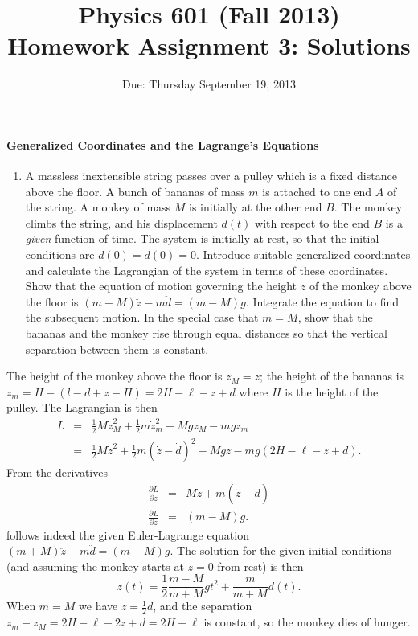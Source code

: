 \documentclass[letterpaper,11pt]{article}
\title{Physics 601 (Fall 2013) \\ Homework Assignment 3: Solutions}
\date{Due: Thursday September 19, 2013}
\begin{document}
\maketitle

\paragraph*{Generalized Coordinates and the Lagrange's Equations}
\begin{enumerate}
 \item A massless inextensible string passes over a pulley which is a fixed distance above the floor.  A bunch of bananas of mass $m$ is attached to one end $A$ of the string.  A monkey of mass $M$ is initially at the other end $B$. The monkey climbs the string, and his displacement $d(t)$ with respect to the end $B$ is a \emph{given} function of time.  The system is initially at rest, so that the initial conditions are $d(0) = \dot{d}(0) = 0$.  Introduce suitable generalized coordinates and calculate the Lagrangian of the system in terms of these coordinates.  Show that the equation of motion governing the height $z$ of the monkey above the floor is $(m+M)\ddot{z} - m\ddot{d} = (m-M)g$.  Integrate the equation to find the subsequent motion.  In the special case that $m = M$, show that the bananas and the monkey rise through equal distances so that the vertical separation between them is constant.
\end{enumerate}
The height of the monkey above the floor is $z_M = z$; the height of the bananas is $z_m = H - (l - d + z - H) = 2 H - \ell - z + d$ where $H$ is the height of the pulley.  The Lagrangian is then
\begin{eqnarray*}
 L & = & \frac{1}{2} M \dot{z}_M^2 + \frac{1}{2} m \dot{z}_m^2 - Mgz_M - mgz_m \\
   & = & \frac{1}{2} M \dot{z}^2 + \frac{1}{2} m (\dot{z} - \dot{d})^2 - Mgz - mg(2H - \ell - z + d).
\end{eqnarray*}
From the derivatives
\begin{eqnarray*}
 \frac{\partial L}{\partial \dot{z}} & = & M \dot{z} + m (\dot{z} - \dot{d}) \\
 \frac{\partial L}{\partial z} & = & (m - M) g.
\end{eqnarray*}
follows indeed the given Euler-Lagrange equation $(m+M)\ddot{z} - m\ddot{d} = (m-M)g$.  The solution for the given initial conditions (and assuming the monkey starts at $z = 0$ from rest) is then
\begin{equation*}
 z(t) = \frac{1}{2} \frac{m - M}{m + M} g t^2 + \frac{m}{m + M} d(t).
\end{equation*}
When $m = M$ we have $z = \frac{1}{2} d$, and the separation $z_m - z_M = 2 H - \ell - 2 z + d = 2 H - \ell$ is constant, so the monkey dies of hunger.
\end{document}
